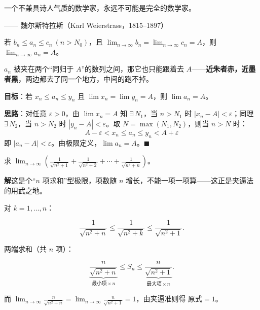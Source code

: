 \documentclass[11pt,a4paper]{article}
\newcommand{\qattr}[1]{{\normalfont\upshape\small\par\raggedleft—— #1\par}}
\newcommand{\keyw}[1]{\colorbox{cYellowL}{\textbf{\color{cOrange}#1}}}
\begin{document}
\begin{quotebox}
一个不兼具诗人气质的数学家，永远不可能是完全的数学家。
\qattr{魏尔斯特拉斯（Karl Weierstrass，1815--1897）}
\end{quotebox}

\begin{thmbox}[数列收敛的夹逼准则]
若 $b_n\le a_n\le c_n\ (n>N_0)$，且 $\displaystyle\lim_{n\to\infty}b_n=\lim_{n\to\infty}c_n=A$，则 $\displaystyle\lim_{n\to\infty}a_n=A$。
\end{thmbox}

\begin{plainbox}[白话解读：夹逼法 = “两面夹击”]
$a_n$ 被夹在两个“同归于 $A$”的数列之间，那它也只能跟着去 $A$——\keyw{近朱者赤，近墨者黑}，两边都去了同一个地方，中间的跑不掉。
\end{plainbox}

\begin{proofbox}[夹逼准则的证明思路]
\textbf{目标}：若 $x_n \leqslant a_n \leqslant y_n$ 且 $\lim x_n = \lim y_n = A$，则 $\lim a_n = A$。

\textbf{思路}：对任意 $\varepsilon > 0$，由 $\lim x_n = A$ 知 $\exists\, N_1$，当 $n > N_1$ 时 $|x_n - A| < \varepsilon$；同理 $\exists\, N_2$，当 $n > N_2$ 时 $|y_n - A| < \varepsilon$。取 $N = \max(N_1, N_2)$，则当 $n > N$ 时：
\[
A - \varepsilon < x_n \leqslant a_n \leqslant y_n < A + \varepsilon
\]
即 $|a_n - A| < \varepsilon$。由极限定义，$\lim a_n = A$。$\blacksquare$
\end{proofbox}

\begin{egbox}[夹逼法求极限]
求 $\displaystyle\lim_{n\to\infty}\left(\frac{1}{\sqrt{n^2+1}}+\frac{1}{\sqrt{n^2+2}}+\cdots+\frac{1}{\sqrt{n^2+n}}\right)$。

\textbf{解}\quad 这是个“$n$ 项求和”型极限，项数随 $n$ 增长，不能一项一项算——这正是夹逼法的用武之地。

对 $k=1,\dots,n$：
\begin{eqbox}\[ \frac{1}{\sqrt{n^2+n}}\le\frac{1}{\sqrt{n^2+k}}\le\frac{1}{\sqrt{n^2+1}}. \]\end{eqbox}
两端求和（共 $n$ 项）：
\begin{eqbox}\[ \underbrace{\frac{n}{\sqrt{n^2+n}}}_{\text{最小项}\times n}\le S_n\le\underbrace{\frac{n}{\sqrt{n^2+1}}}_{\text{最大项}\times n}. \]\end{eqbox}
而 $\displaystyle\lim_{n\to\infty}\frac{n}{\sqrt{n^2+n}}=\lim_{n\to\infty}\frac{n}{\sqrt{n^2+1}}=1$，由夹逼准则得 $\boxed{\text{原式}=1}$。
\end{egbox}
\end{document}

